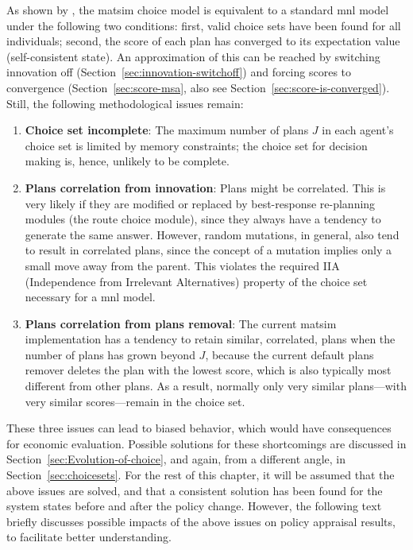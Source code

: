 As shown by \citet[][also see Chapter~\ref{ch:abta} and Section~\ref{sec:score-is-converged}]{NagelFloetteroed2009IatbrResourceInBook}, the \acrshort{matsim} choice model is equivalent to a standard \gls{mnl} model under the following two conditions: first, valid choice sets have been found for all individuals; second, the score of each plan has converged to its expectation value (self-consistent state).
%
An approximation of this can be reached by switching innovation off (Section~\ref{sec:innovation-switchoff}) and forcing scores to convergence (Section~\ref{sec:score-msa}, also see Section~\ref{sec:score-is-converged}). 
Still, the following methodological issues remain:
%
\begin{enumerate}\styleEnumerate
%
\item \textbf{Choice set incomplete}: The maximum number of plans $J$ in each agent's choice set is limited by memory constraints; the choice set for decision making is, hence, unlikely to be complete.
%
\item \textbf{Plans correlation from innovation}: Plans might be correlated. This is very likely if they are modified or replaced by best-response re-planning modules (\eg the route choice module), since they always have a tendency to generate the same answer. However, random mutations, in general, also tend to result in correlated plans, since the concept of a mutation  implies only a small move away from the parent.  This violates the required IIA (Independence from Irrelevant Alternatives) property of the choice set necessary for a \gls{mnl} model.
%
\item \textbf{Plans correlation from plans removal}: The current \acrshort{matsim} implementation has a tendency to retain similar, \ie  correlated, plans when the number of plans has grown beyond $J$, because the current default plans remover deletes the plan with the lowest score, which is also typically most different from other plans.  As a result, normally only very similar plans---with very similar scores---remain in the choice set.
%
\end{enumerate}
%
These three issues 
can lead to biased behavior, which would have 
consequences for economic evaluation.  Possible solutions for these shortcomings are discussed 
in Section~\ref{sec:Evolution-of-choice}, and again, from a different angle, in Section~\ref{sec:choicesets}. For the rest of this chapter, it will be assumed that the above issues are solved, and that a consistent solution has been found for the system states before and after the policy change.
%
However, the following text briefly discusses possible impacts of the above issues on policy appraisal results, to facilitate better understanding.

